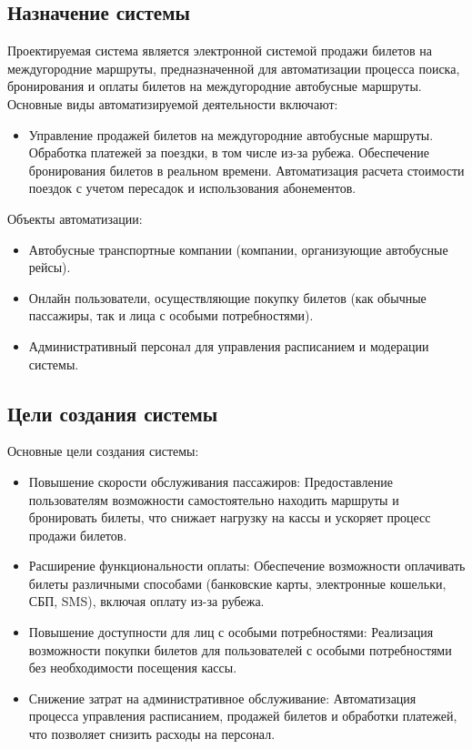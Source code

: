 \subsection{Назначение системы}
Проектируемая система является электронной системой продажи билетов на
междугородние маршруты, предназначенной для автоматизации процесса поиска,
бронирования и оплаты билетов на междугородние автобусные маршруты. Основные
виды автоматизируемой деятельности включают:
\begin{itemize}
    \item Управление продажей билетов на междугородние автобусные маршруты.
    Обработка платежей за поездки, в том числе из-за рубежа.
    Обеспечение бронирования билетов в реальном времени.
    Автоматизация расчета стоимости поездок с учетом пересадок и использования абонементов.
\end{itemize}

\noindent Объекты автоматизации:
\begin{itemize}
    \item Автобусные транспортные компании (компании, организующие автобусные
    рейсы).
    \item Онлайн пользователи, осуществляющие покупку билетов (как обычные
    пассажиры, так и лица с особыми потребностями).
    \item Административный персонал для управления расписанием и модерации
    системы.
\end{itemize}

\subsection{Цели создания системы}
\noindent Основные цели создания системы:
\begin{itemize}
    \item Повышение скорости обслуживания пассажиров: Предоставление
    пользователям возможности самостоятельно находить маршруты и бронировать
    билеты, что снижает нагрузку на кассы и ускоряет процесс продажи билетов.
    \item Расширение функциональности оплаты: Обеспечение возможности оплачивать
    билеты различными способами (банковские карты, электронные кошельки, СБП,
    SMS), включая оплату из-за рубежа.
    \item Повышение доступности для лиц с особыми потребностями:
    Реализация возможности покупки билетов для пользователей с особыми потребностями
    без необходимости посещения кассы.
    \item Снижение затрат на административное обслуживание: Автоматизация процесса
    управления расписанием, продажей билетов и обработки платежей, что позволяет
    снизить расходы на персонал.
\end{itemize}

